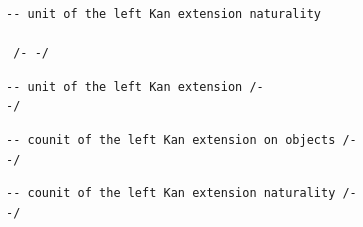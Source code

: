 \documentclass{book}
\theoremstyle{definition}
\newcounter{lcounter}
\begin{document}
\begin{center} \begin{tcolorbox}[width=5in,colback={white},title={\begin{center}\texttt{Lean \thelcounter} \addtocounter{lcounter}{1} \end{center}},colbacktitle=Blue,coltitle=black] \begin{verbatim}
-- unit of the left Kan extension naturality

 /- -/
\end{verbatim} \end{tcolorbox} \end{center}
\begin{center} \begin{tcolorbox}[width=5in,colback={white},title={\begin{center}\texttt{Lean \thelcounter} \addtocounter{lcounter}{1} \end{center}},colbacktitle=Blue,coltitle=black] \begin{verbatim}
-- unit of the left Kan extension /-
-/
\end{verbatim} \end{tcolorbox} \end{center}
\begin{center} \begin{tcolorbox}[width=5in,colback={white},title={\begin{center}\texttt{Lean \thelcounter} \addtocounter{lcounter}{1} \end{center}},colbacktitle=Blue,coltitle=black] \begin{verbatim}
-- counit of the left Kan extension on objects /-
-/
\end{verbatim} \end{tcolorbox} \end{center}
\begin{center}

 \begin{tcolorbox}[width=5in,colback={white},title={\begin{center}\texttt{Lean \thelcounter} \addtocounter{lcounter}{1} \end{center}},colbacktitle=Blue,coltitle=black] \begin{verbatim}
-- counit of the left Kan extension naturality /-
-/
\end{verbatim} \end{tcolorbox} \end{center}
\end{document}
